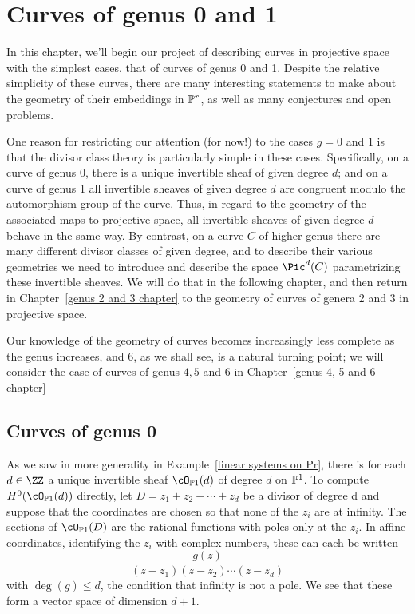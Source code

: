

\chapter{Curves of genus 0 and 1}\label{genus 0 and 1 chapter}

In this chapter, we'll begin our project of describing curves in projective space with the simplest cases, that of curves of genus 0 and 1. Despite the relative simplicity of these curves, there are many interesting statements to make about the geometry of their embeddings in $\PP^r$, as well as many conjectures and open problems.

One reason for restricting our attention (for now!) to the cases $g=0$ and $1$ is that the divisor class theory is particularly simple in these cases. Specifically, on a curve of genus 0, there is a unique invertible sheaf of given degree $d$; and on a curve of genus 1 all invertible sheaves of given degree $d$ are congruent modulo the automorphism group of the curve. Thus, in regard to the geometry of the associated maps to projective space, all invertible sheaves of given degree $d$ behave in the same way. By contrast, on a curve $C$ of higher genus there are many different divisor classes of given degree, and to describe their various geometries we need to  introduce and describe the space $\Pic^d(C)$ parametrizing these invertible sheaves. We will do that in the following chapter, and then return in Chapter~\ref{genus 2 and 3 chapter} to the geometry of curves of genera 2 and 3 in projective space. 

Our knowledge of the geometry of curves becomes increasingly less complete as the genus increases, and 6, as we shall see, is a natural turning point; we will consider the case of curves of genus $4, 5$ and $6$ in Chapter~\ref{genus 4, 5 and 6 chapter}


\section{Curves of genus 0} 


As we saw in more generality in Example~\ref{linear systems on Pr}, there is for each $d \in \ZZ$  a unique invertible sheaf $\cO_{\PP1} (d)$
of degree $d$ on $\PP^1$. To compute $H^0(\cO_{\PP1} (d))$ directly, let $D = z_1 +z_2 +\cdots+z_d$ be a divisor of degree d and suppose that the coordinates are chosen so that none of the $z_i$ are at infinity. The sections of $\cO_{\PP1} (D)$ are the rational functions with poles only at 
the $z_i$. In affine coordinates, identifying the $z_i$ with complex numbers, these can each be written
$$
\frac{g(z)}{(z-z_1)(z-z_2)\cdots(z-z_d)}
$$
with $\deg(g) \leq d$, the condition that infinity is not a pole. We see that these form a vector space of dimension $d+1$.

